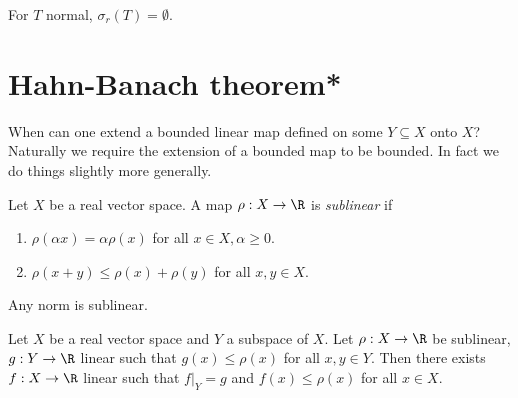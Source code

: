 \documentclass[a4paper]{article}
\begin{document}
\begin{corollary}
  For \(T\) normal, \(\sigma_r(T) = \emptyset\).
\end{corollary}









\section{Hahn-Banach theorem*}

When can one extend a bounded linear map defined on some \(Y \subseteq X\) onto \(X\)? Naturally we require the extension of a bounded map to be bounded. In fact we do things slightly more generally.

\begin{definition}
  Let \(X\) be a real vector space. A map \(\rho: X \to \R\) is \emph{sublinear} if
  \begin{enumerate}
  \item \(\rho(\alpha x) = \alpha \rho(x)\) for all \(x \in X, \alpha \geq 0\).
  \item \(\rho(x + y) \leq \rho(x) + \rho(y)\) for all \(x, y \in X\).
  \end{enumerate}
\end{definition}

\begin{eg}
  Any norm is sublinear.
\end{eg}

\begin{theorem}
  \label{thm:Hahn-Banach}
  Let \(X\) be a real vector space and \(Y\) a subspace of \(X\). Let \(\rho: X \to \R\) be sublinear, \(g: Y \to \R\) linear such that \(g(x) \leq \rho(x)\) for all \(x, y \in Y\). Then there exists \(f: X \to \R\) linear such that \(f|_Y = g\) and \(f(x) \leq \rho(x)\) for all \(x \in X\).
\end{theorem}
\end{document}
